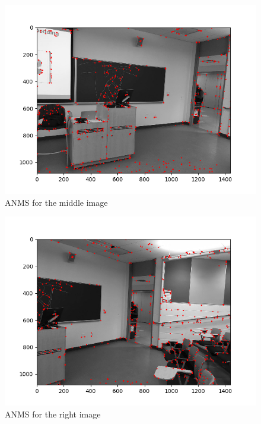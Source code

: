 \documentclass[10pt]{article}
\begin{document}
	\begin{figure}[h]
		\caption{ANMS for the middle image}
		\centering
		\includegraphics{img/anmsM.png}
	\end{figure}

    	\begin{figure}[h]
		\caption{ANMS for the right image}
		\centering
		\includegraphics{img/anmsR.png}
	\end{figure}
        
\end{document}

